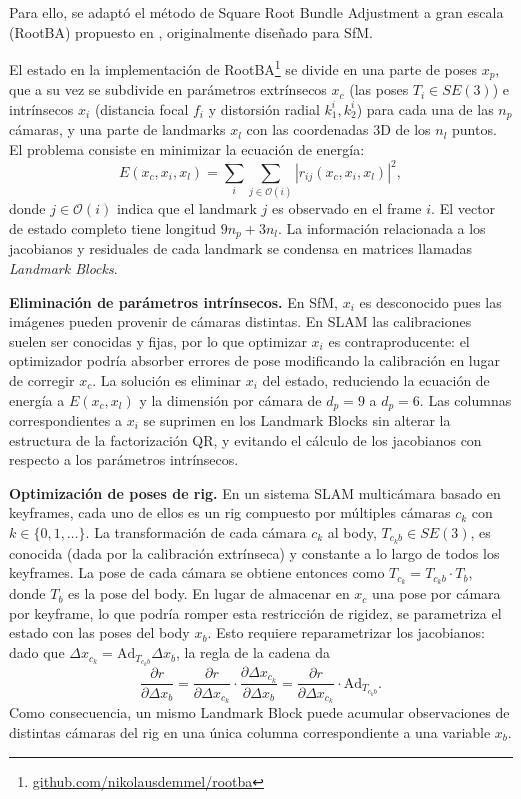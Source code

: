 Para ello, se adaptó el método de Square Root Bundle Adjustment a gran escala (RootBA) propuesto en \cite{demmelBasaltSquareRoot2021a}, originalmente diseñado para SfM.

El estado en la implementación de RootBA\footnote{\href{https://github.com/nikolausdemmel/rootba}{github.com/nikolausdemmel/rootba}}
se divide en una parte de poses $x_p$, que a su vez se subdivide en parámetros extrínsecos $x_c$ (las poses ${T_i \in SE(3)}$) e intrínsecos $x_i$ (distancia focal $f_i$ y distorsión radial $k_1^i, k_2^i$) para cada una de las $n_p$ cámaras, y una parte de landmarks $x_l$ con las coordenadas 3D de los $n_l$ puntos. El problema consiste en minimizar la ecuación de energía:
\begin{equation}
E(x_c, x_i, x_l) = \sum_{i}\sum_{j \in \mathcal{O}(i)} |r_{ij}(x_c, x_i, x_l)|^2,
\label{eq:ba_energy}
\end{equation}
donde $j \in \mathcal{O}(i)$ indica que el landmark $j$ es observado en el frame $i$. El vector de estado completo tiene longitud $9n_p + 3n_l$. La información relacionada a los jacobianos y residuales de cada landmark se condensa en matrices llamadas \textit{Landmark Blocks}.

\textbf{Eliminación de parámetros intrínsecos.} En SfM, $x_i$ es desconocido pues las imágenes pueden provenir de cámaras distintas. En SLAM las calibraciones suelen ser conocidas y fijas, por lo que optimizar $x_i$ es contraproducente: el optimizador podría absorber errores de pose modificando la calibración en lugar de corregir $x_c$. La solución es eliminar $x_i$ del estado, reduciendo la ecuación de energía a $E(x_c, x_l)$ y la dimensión por cámara de $d_p = 9$ a $d_p = 6$. Las columnas correspondientes a $x_i$ se suprimen en los Landmark Blocks sin alterar la estructura de la factorización QR, y evitando el cálculo de los jacobianos con respecto a los parámetros intrínsecos.

\textbf{Optimización de poses de rig.} En un sistema SLAM multicámara basado en keyframes, cada uno de ellos es un rig compuesto por múltiples cámaras $c_k$ con $k \in \{0, 1, \ldots \}$. La transformación de cada cámara $c_k$ al body, $T_{c_k b} \in SE(3)$, es conocida (dada por la calibración extrínseca) y constante a lo largo de todos los keyframes. La pose de cada cámara se obtiene entonces como $T_{c_k} = T_{c_k b}\cdot T_b$, donde $T_b$ es la pose del body. En lugar de almacenar en $x_c$ una pose por cámara por keyframe, lo que podría romper esta restricción de rigidez, se parametriza el estado con las poses del body $x_b$. Esto requiere reparametrizar los jacobianos: dado que $\Delta x_{c_k} = \mathrm{Ad}_{T_{c_k b}} \Delta x_b$, la regla de la cadena da
\begin{equation}
\frac{\partial r}{\partial \Delta x_b} = \frac{\partial r}{\partial \Delta x_{c_k}} \cdot \frac{\partial \Delta x_{c_k}}{\partial \Delta x_b} = \frac{\partial r}{\partial \Delta x_{c_k}}\cdot \mathrm{Ad}_{T_{c_k b}}.
\end{equation}
Como consecuencia, un mismo Landmark Block puede acumular observaciones de distintas cámaras del rig en una única columna correspondiente a una variable $x_b$.

